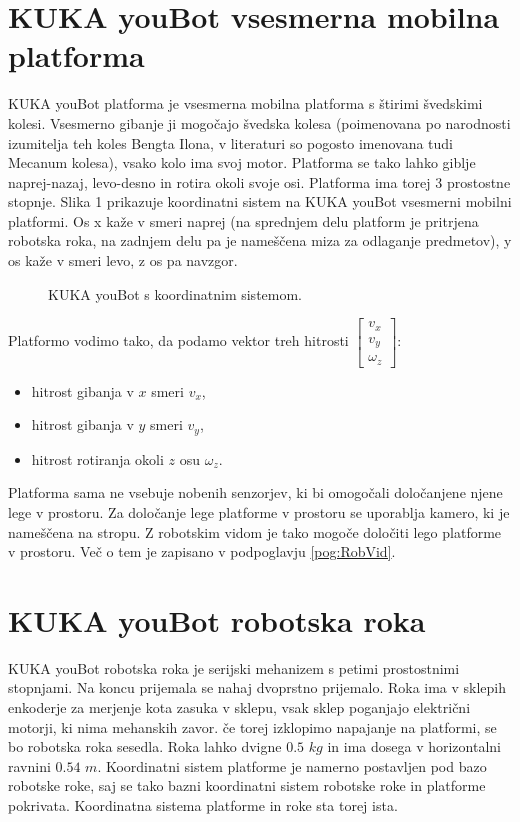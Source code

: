 \section{KUKA youBot vsesmerna mobilna platforma}

KUKA youBot platforma je vsesmerna mobilna platforma s štirimi švedskimi kolesi. Vsesmerno gibanje ji mogočajo švedska kolesa (poimenovana po narodnosti izumitelja teh koles Bengta Ilona, v literaturi so pogosto imenovana tudi Mecanum kolesa), vsako kolo ima svoj motor. Platforma se tako lahko giblje naprej-nazaj, levo-desno in rotira okoli svoje osi. Platforma ima torej 3 prostostne stopnje.
Slika 1 prikazuje koordinatni sistem na KUKA youBot vsesmerni mobilni platformi. Os x kaže v smeri naprej (na sprednjem delu platform je pritrjena robotska roka, na zadnjem delu pa je nameščena miza za odlaganje predmetov), y os kaže v smeri levo, z os pa navzgor. \vspace{1cm}

\begin{figure}[h]
\centering {}
\caption{KUKA youBot s koordinatnim sistemom.}
\label{fig:KUKA1}
\end{figure}

Platformo vodimo tako, da podamo vektor treh hitrosti $\begin{bmatrix} v_x \\ v_y \\ \omega_z \end{bmatrix}$:
\begin{itemize}
\item hitrost gibanja v $x$ smeri $v_x$,
\item hitrost gibanja v $y$ smeri $v_y$,
\item hitrost rotiranja okoli $z$ osu $\omega_z$.
\end{itemize}
Platforma sama ne vsebuje nobenih senzorjev, ki bi omogočali določanjene njene lege v prostoru. Za določanje lege platforme v prostoru se uporablja kamero, ki je nameščena na stropu. Z robotskim vidom je tako mogoče določiti lego platforme v prostoru. Več o tem je zapisano v podpoglavju \ref{pog:RobVid}.

\section{KUKA youBot robotska roka}

KUKA youBot robotska roka je serijski mehanizem s petimi prostostnimi stopnjami. Na koncu prijemala se nahaj dvoprstno prijemalo. Roka ima v sklepih enkoderje za merjenje kota zasuka v sklepu, vsak sklep poganjajo električni motorji, ki nima mehanskih zavor. če torej izklopimo napajanje na platformi, se bo robotska roka sesedla. Roka lahko dvigne $0.5$ $kg$ in ima dosega v horizontalni ravnini $0.54$ $m$. Koordinatni sistem platforme je namerno postavljen pod bazo robotske roke, saj se tako bazni koordinatni sistem robotske roke in platforme pokrivata. Koordinatna sistema platforme in roke sta torej ista.

